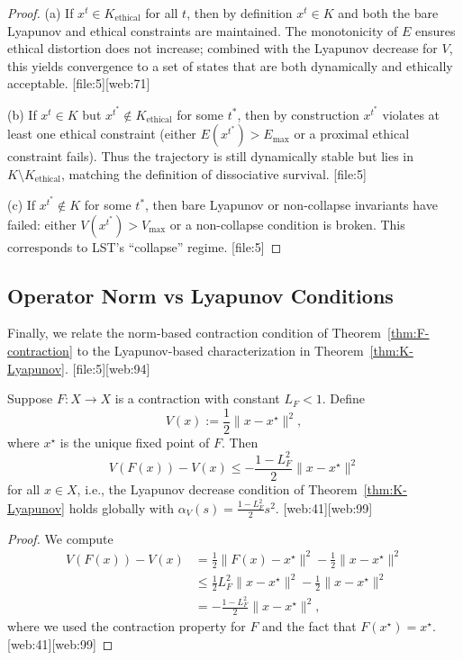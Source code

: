 \documentclass[11pt]{article}
\begin{document}
\begin{proof}
(a) If \(x^t\in K_{\text{ethical}}\) for all \(t\), then by definition \(x^t\in K\) and both the bare Lyapunov and ethical constraints are maintained. The monotonicity of \(E\) ensures ethical distortion does not increase; combined with the Lyapunov decrease for \(V\), this yields convergence to a set of states that are both dynamically and ethically acceptable. [file:5][web:71]

(b) If \(x^t\in K\) but \(x^{t^\ast}\notin K_{\text{ethical}}\) for some \(t^\ast\), then by construction \(x^{t^\ast}\) violates at least one ethical constraint (either \(E(x^{t^\ast})>E_{\max}\) or a proximal ethical constraint fails). Thus the trajectory is still dynamically stable but lies in \(K\setminus K_{\text{ethical}}\), matching the definition of dissociative survival. [file:5]

(c) If \(x^{t^\ast}\notin K\) for some \(t^\ast\), then bare Lyapunov or non-collapse invariants have failed: either \(V(x^{t^\ast})>V_{\max}\) or a non-collapse condition is broken. This corresponds to LST's ``collapse'' regime. [file:5]
\end{proof}

\subsection{Operator Norm vs Lyapunov Conditions}

Finally, we relate the norm-based contraction condition of Theorem~\ref{thm:F-contraction} to the Lyapunov-based characterization in Theorem~\ref{thm:K-Lyapunov}. [file:5][web:94]

\begin{proposition}
Suppose \(F:X\to X\) is a contraction with constant \(L_F<1\). Define
\[
  V(x) := \frac{1}{2}\|x - x^\star\|^2,
\]
where \(x^\star\) is the unique fixed point of \(F\). Then
\[
  V(F(x)) - V(x) \leq -\frac{1-L_F^2}{2} \|x - x^\star\|^2
\]
for all \(x\in X\), i.e., the Lyapunov decrease condition of Theorem~\ref{thm:K-Lyapunov} holds globally with \(\alpha_V(s) = \frac{1-L_F^2}{2} s^2\). [web:41][web:99]
\end{proposition}

\begin{proof}
We compute
\begin{align*}
  V(F(x)) - V(x)
  &= \frac{1}{2}\|F(x) - x^\star\|^2 - \frac{1}{2}\|x - x^\star\|^2 \\
  &\leq \frac{1}{2} L_F^2 \|x - x^\star\|^2 - \frac{1}{2}\|x - x^\star\|^2 \\
  &= -\frac{1-L_F^2}{2} \|x - x^\star\|^2,
\end{align*}
where we used the contraction property for \(F\) and the fact that \(F(x^\star) = x^\star\). [web:41][web:99]
\end{proof}
\end{document}
